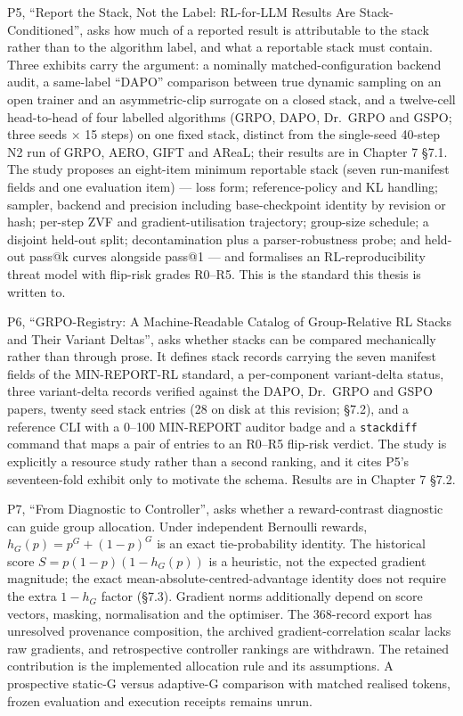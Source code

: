 \documentclass[12pt,a4paper]{report}
\begin{document}
P5, ``Report the Stack, Not the Label: RL-for-LLM Results Are
Stack-Conditioned'', asks how much of a reported result is attributable
to the stack rather than to the algorithm label, and what a reportable
stack must contain. Three exhibits carry the argument: a nominally
matched-configuration backend audit, a same-label ``DAPO'' comparison
between true dynamic sampling on an open trainer and an asymmetric-clip
surrogate on a closed stack, and a twelve-cell head-to-head of four
labelled algorithms (GRPO, DAPO, Dr.~GRPO and GSPO; three seeds × 15
steps) on one fixed stack, distinct from the single-seed 40-step N2 run
of GRPO, AERO, GIFT and AReaL; their results are in Chapter 7 §7.1. The
study proposes an eight-item minimum reportable stack (seven
run-manifest fields and one evaluation item) --- loss form;
reference-policy and KL handling; sampler, backend and precision
including base-checkpoint identity by revision or hash; per-step ZVF and
gradient-utilisation trajectory; group-size schedule; a disjoint
held-out split; decontamination plus a parser-robustness probe; and
held-out pass@k curves alongside pass@1 --- and formalises an
RL-reproducibility threat model with flip-risk grades R0--R5. This is
the standard this thesis is written to.

P6, ``GRPO-Registry: A Machine-Readable Catalog of Group-Relative RL
Stacks and Their Variant Deltas'', asks whether stacks can be compared
mechanically rather than through prose. It defines stack records
carrying the seven manifest fields of the MIN-REPORT-RL standard, a
per-component variant-delta status, three variant-delta records verified
against the DAPO, Dr.~GRPO and GSPO papers, twenty seed stack entries
(28 on disk at this revision; §7.2), and a reference CLI with a 0--100
MIN-REPORT auditor badge and a \texttt{stackdiff} command that maps a
pair of entries to an R0--R5 flip-risk verdict. The study is explicitly
a resource study rather than a second ranking, and it cites P5's
seventeen-fold exhibit only to motivate the schema. Results are in
Chapter 7 §7.2.

P7, ``From Diagnostic to Controller'', asks whether a reward-contrast
diagnostic can guide group allocation. Under independent Bernoulli
rewards, \(h_G(p)=p^G+(1-p)^G\) is an exact tie-probability identity.
The historical score \(S=p(1-p)(1-h_G(p))\) is a heuristic, not the
expected gradient magnitude; the exact mean-absolute-centred-advantage
identity does not require the extra \(1-h_G\) factor (§7.3). Gradient
norms additionally depend on score vectors, masking, normalisation and
the optimiser. The 368-record export has unresolved provenance
composition, the archived gradient-correlation scalar lacks raw
gradients, and retrospective controller rankings are withdrawn. The
retained contribution is the implemented allocation rule and its
assumptions. A prospective static-G versus adaptive-G comparison with
matched realised tokens, frozen evaluation and execution receipts
remains unrun.
\end{document}
